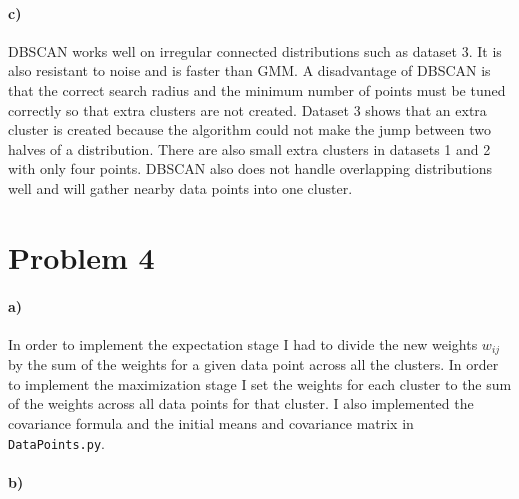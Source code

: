 \documentclass[12pt]{article}
\begin{document}
\paragraph{c)}

DBSCAN works well on irregular connected distributions such as dataset 3. It is also resistant to noise and is faster than GMM. A disadvantage
of DBSCAN is that the correct search radius and the minimum number of points must be tuned correctly so that extra clusters are not created.
Dataset 3 shows that an extra cluster is created because the algorithm could not make the jump between two halves of a distribution. There
are also small extra clusters in datasets 1 and 2 with only four points. DBSCAN also does not handle overlapping distributions well and
will gather nearby data points into one cluster.

\section*{Problem 4}

\paragraph{a)}

In order to implement the expectation stage I had to divide the new weights \(w_{ij}\) by the sum of the weights for a given data point
across all the clusters. In order to implement the maximization stage I set the weights for each cluster to the sum of the weights across
all data points for that cluster. I also implemented the covariance formula and the initial means and covariance matrix in \texttt{DataPoints.py}.

\paragraph{b)}
\end{document}
